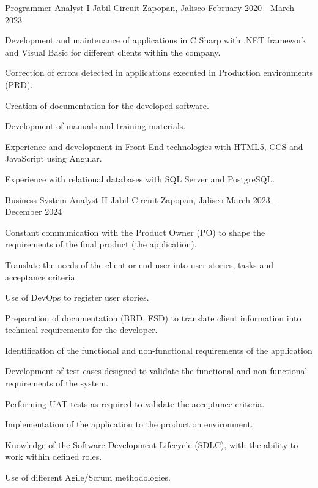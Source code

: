 \begin{cventries}
\vspace{0.5cm}
\cventry
{Programmer Analyst I} %
{Jabil Circuit} %
{Zapopan, Jalisco} %
{February 2020 - March 2023} %
{ %
\begin{cvitems}
\item {Development and maintenance of applications in C Sharp with .NET framework and Visual Basic for different clients within the company.}
\item{Correction of errors detected in applications executed in Production environments (PRD).}
\item{Creation of documentation for the developed software.}
\item{Development of manuals and training materials.}
\item{Experience and development in Front-End technologies with HTML5, CCS and JavaScript using Angular.}
\item{Experience with relational databases with SQL Server and PostgreSQL.}
\end{cvitems}
}

\vspace{0.5cm}
\cventry
{Business System Analyst II} %
{Jabil Circuit} %
{Zapopan, Jalisco} %
{March 2023 - December 2024} %
{ %
\begin{cvitems}
\item {Constant communication with the Product Owner (PO) to shape the requirements of the final product (the application).}
\item{Translate the needs of the client or end user into user stories, tasks and acceptance criteria.}
\item{Use of DevOps to register user stories.}
\item{Preparation of documentation (BRD, FSD) to translate client information into technical requirements for the developer.}
\item{Identification of the functional and non-functional requirements of the application}
\item{Development of test cases designed to validate the functional and non-functional requirements of the system.}
\item {Performing UAT tests as required to validate the acceptance criteria.}
\item{Implementation of the application to the production environment.}
\item{Knowledge of the Software Development Lifecycle (SDLC), with the ability to work within defined roles.}
\item{Use of different Agile/Scrum methodologies.}
\end{cvitems} 
}


\end{cventries}
